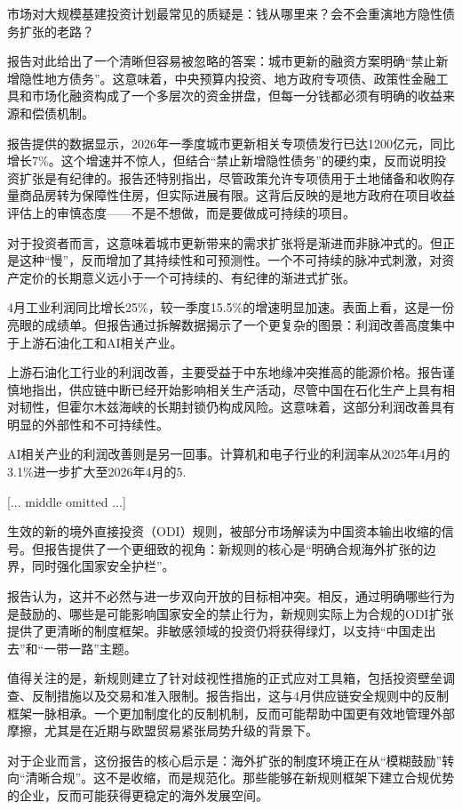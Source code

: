 \documentclass[11pt]{ctexart}
\begin{document}
市场对大规模基建投资计划最常见的质疑是：钱从哪里来？会不会重演地方隐性债务扩张的老路？

报告对此给出了一个清晰但容易被忽略的答案：城市更新的融资方案明确“禁止新增隐性地方债务”。这意味着，中央预算内投资、地方政府专项债、政策性金融工具和市场化融资构成了一个多层次的资金拼盘，但每一分钱都必须有明确的收益来源和偿债机制。

报告提供的数据显示，2026年一季度城市更新相关专项债发行已达1200亿元，同比增长7\%。这个增速并不惊人，但结合“禁止新增隐性债务”的硬约束，反而说明投资扩张是有纪律的。报告还特别指出，尽管政策允许专项债用于土地储备和收购存量商品房转为保障性住房，但实际进展有限。这背后反映的是地方政府在项目收益评估上的审慎态度——不是不想做，而是要做成可持续的项目。

对于投资者而言，这意味着城市更新带来的需求扩张将是渐进而非脉冲式的。但正是这种“慢”，反而增加了其持续性和可预测性。一个不可持续的脉冲式刺激，对资产定价的长期意义远小于一个可持续的、有纪律的渐进式扩张。

4月工业利润同比增长25\%，较一季度15.5\%的增速明显加速。表面上看，这是一份亮眼的成绩单。但报告通过拆解数据揭示了一个更复杂的图景：利润改善高度集中于上游石油化工和AI相关产业。

上游石油化工行业的利润改善，主要受益于中东地缘冲突推高的能源价格。报告谨慎地指出，供应链中断已经开始影响相关生产活动，尽管中国在石化生产上具有相对韧性，但霍尔木兹海峡的长期封锁仍构成风险。这意味着，这部分利润改善具有明显的外部性和不可持续性。

AI相关产业的利润改善则是另一回事。计算机和电子行业的利润率从2025年4月的3.1\%进一步扩大至2026年4月的5.

[... middle omitted ...]

生效的新的境外直接投资（ODI）规则，被部分市场解读为中国资本输出收缩的信号。但报告提供了一个更细致的视角：新规则的核心是“明确合规海外扩张的边界，同时强化国家安全护栏”。

报告认为，这并不必然与进一步双向开放的目标相冲突。相反，通过明确哪些行为是鼓励的、哪些是可能影响国家安全的禁止行为，新规则实际上为合规的ODI扩张提供了更清晰的制度框架。非敏感领域的投资仍将获得绿灯，以支持“中国走出去”和“一带一路”主题。

值得关注的是，新规则建立了针对歧视性措施的正式应对工具箱，包括投资壁垒调查、反制措施以及交易和准入限制。报告指出，这与4月供应链安全规则中的反制框架一脉相承。一个更加制度化的反制机制，反而可能帮助中国更有效地管理外部摩擦，尤其是在近期与欧盟贸易紧张局势升级的背景下。

对于企业而言，这份报告的核心启示是：海外扩张的制度环境正在从“模糊鼓励”转向“清晰合规”。这不是收缩，而是规范化。那些能够在新规则框架下建立合规优势的企业，反而可能获得更稳定的海外发展空间。
\end{document}
